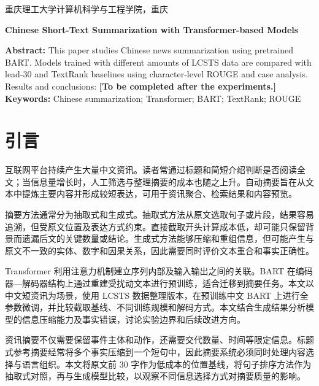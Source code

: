 \documentclass{sdxxpaper}
\begin{document}
\makecover
\cqutBeginReportBody
{}
\setlength{\emergencystretch}{2em}
\makepaperheading
\begin{center}
  \makepaperauthor\par
  {\small 重庆理工大学计算机科学与工程学院，重庆}
\end{center}

\begin{center}\textbf{Chinese Short-Text Summarization with Transformer-based Models}\end{center}
\noindent\textbf{Abstract:} This paper studies Chinese news summarization using pretrained BART. Models trained with different amounts of LCSTS data are compared with lead-30 and TextRank baselines using character-level ROUGE and case analysis. Results and conclusions: \textbf{[To be completed after the experiments.] }\\
\noindent\textbf{Keywords:} Chinese summarization; Transformer; BART; TextRank; ROUGE


\section{引言}
互联网平台持续产生大量中文资讯。读者常通过标题和简短介绍判断是否阅读全文；当信息量增长时，人工筛选与整理摘要的成本也随之上升。自动摘要旨在从文本中提炼主要内容并形成较短表达，可用于资讯聚合、检索结果和内容预览。

摘要方法通常分为抽取式和生成式。抽取式方法从原文选取句子或片段，结果容易追溯，但受原文位置及表达方式约束。直接截取开头计算成本低，却可能只保留背景而遗漏后文的关键数量或结论。生成式方法能够压缩和重组信息，但可能产生与原文不一致的实体、数字和因果关系，因此需要同时评价文本重合和事实正确性。

Transformer 利用注意力机制建立序列内部及输入输出之间的关联\cite{transformer}。BART 在编码器—解码器结构上通过重建受扰动文本进行预训练，适合迁移到摘要任务\cite{bart}。本文以中文短资讯为场景，使用 LCSTS 数据整理版本，在预训练中文 BART 上进行全参数微调，并比较截取基线、不同训练规模和解码方式。本文结合生成结果分析模型的信息压缩能力及事实错误，讨论实验边界和后续改进方向。

资讯摘要不仅需要保留事件主体和动作，还需要交代数量、时间等限定信息。标题式参考摘要经常将多个事实压缩到一个短句中，因此摘要系统必须同时处理内容选择与语言组织。本文将原文前 30 字作为低成本的位置基线，将句子排序方法作为抽取式对照，再与生成模型比较，以观察不同信息选择方式对摘要质量的影响。
\end{document}
